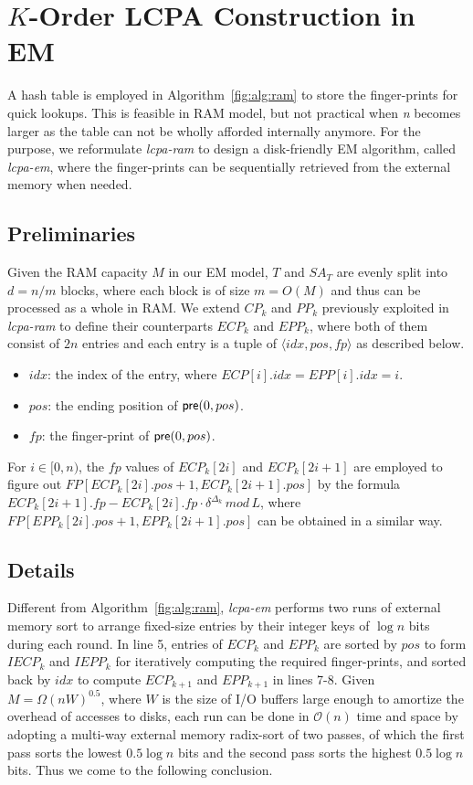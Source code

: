 \documentclass{llncs}
\begin{document}
\section{$K$-Order LCPA Construction in EM}\label{sec:construction_in_em}

A hash table is employed in Algorithm~\ref{fig:alg:ram} to store the finger-prints for quick lookups. This is feasible in {RAM} model, but not practical when {\em n} becomes larger as the table can not be wholly afforded internally anymore. For the purpose, we reformulate {\em lcpa-ram} to design a disk-friendly {EM} algorithm, called {\em lcpa-em}, where the finger-prints can be sequentially retrieved from the external memory when needed.

\subsection{Preliminaries}

Given the {RAM} capacity $M$ in our {EM} model, $T$ and $SA_T$ are evenly split into $d=n/m$ blocks, where each block is of size $m=O(M)$ and thus can be processed as a whole in {RAM}. We extend $CP_k$ and $PP_k$ previously exploited in {\em lcpa-ram} to define their counterparts $ECP_k$ and $EPP_k$, where both of them consist of $2n$ entries and each entry is a tuple of $\langle idx, pos, fp \rangle$ as described below.
\begin{itemize}
\item $idx$: the index of the entry, where $ECP[i].idx=EPP[i].idx=i$.
\item $pos$: the ending position of ${\sf pre}(0,pos)$.
\item $fp$: the finger-print of ${\sf pre}(0,pos)$.
\end{itemize}

For $i\in [0,n)$, the $fp$ values of $ECP_k[2i]$ and $ECP_k[2i+1]$ are employed to figure out $FP[ECP_k[2i].pos+1, ECP_k[2i+1].pos]$ by the formula $ECP_k[2i+1].fp - ECP_k[2i].fp \cdot \delta^{\Delta_k} \, mod \, L$, where $FP[EPP_k[2i].pos+1, EPP_k[2i+1].pos]$ can be obtained in a similar way.

\subsection{Details}
Different from Algorithm~\ref{fig:alg:ram}, {\em lcpa-em} performs two runs of external memory sort to arrange fixed-size entries by their integer keys of $\log n$ bits during each round. In line 5, entries of $ECP_k$ and $EPP_k$ are sorted by $pos$ to form $IECP_k$ and $IEPP_k$ for iteratively computing the required finger-prints, and sorted back by $idx$ to compute $ECP_{k+1}$ and $EPP_{k+1}$ in lines 7-8. Given $M=\Omega(nW)^{0.5}$, where $W$ is the size of {I/O} buffers large enough to amortize the overhead of accesses to disks, each run can be done in $\mathcal{O}(n)$ time and space by adopting a multi-way external memory radix-sort of two passes, of which the first pass sorts the lowest $0.5\log n$ bits and the second pass sorts the highest $0.5\log n$ bits. Thus we come to the following conclusion.
\end{document}
